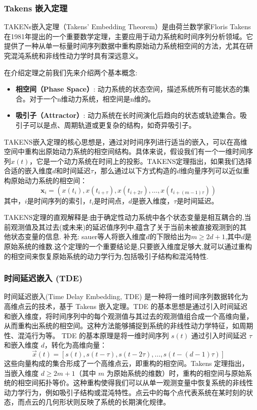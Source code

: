 \subsubsection{Takens 嵌入定理}
TAKENs嵌入定理（Takens' Embedding Theorem）\cite{takens2006detecting}是由荷兰数学家Floris Takens在1981年提出的一个重要数学定理，主要应用于动力系统和时间序列分析领域。它提供了一种从单一标量时间序列数据中重构原始动力系统相空间的方法，尤其在研究混沌系统和非线性动力学时具有深远意义。

在介绍定理之前我们先来介绍两个基本概念:
\begin{itemize}
    \item \textbf{相空间（Phase Space）}: 动力系统的状态空间，描述系统所有可能状态的集合。对于一个n维动力系统，相空间是n维的。
    \item \textbf{吸引子（Attractor）}: 动力系统在长时间演化后趋向的状态或轨迹集合。吸引子可以是点、周期轨道或更复杂的结构，如奇异吸引子。
\end{itemize}
TAKENS嵌入定理的核心思想是，通过对时间序列进行适当的嵌入，可以在高维空间中重构出原始动力系统的相空间结构。具体来说，假设我们有一个一维时间序列$x(t)$，它是一个动力系统在时间上的投影。TAKENS定理指出，如果我们选择合适的嵌入维度$d$和时间延迟$\tau$，那么通过以下方式构造的$d$维向量序列可以近似重构原始动力系统的相空间：
\begin{equation}
    \mathbf{x}_i = (x(t_i), x(t_{i+\tau}), x(t_{i+2\tau}), \ldots, x(t_{i+(m-1)\tau}))
\end{equation}
其中，$i$是时间序列的索引，$t_i$是时间点，$d$是嵌入维度，$\tau$是时间延迟。

TAKENS定理的直观解释是:由于确定性动力系统中各个状态变量是相互耦合的,当前观测值及其过去(或未来)的延迟值序列中,蕴含了关于当前未被直接观测到的其他状态变量的信息.
补充: sauer等人将嵌入维度$d$的下限给出为$m\geq 2d+1$,其中$d$是原始系统的维数.这个定理的一个重要结论是,只要嵌入维度足够大,就可以通过重构的相空间来恢复原始系统的动力学行为,包括吸引子结构和混沌特性.



\subsubsection{时间延迟嵌入 (TDE)}
时间延迟嵌入(Time Delay Embedding, TDE) 是一种将一维时间序列数据转化为高维点云的技术，基于 Takens 嵌入定理。TDE 的基本思想是通过引入时间延迟和嵌入维度，将时间序列中的每个观测值与其过去的观测值组合成一个高维向量，从而重构出系统的相空间。这种方法能够捕捉到系统的非线性动力学特征，如周期性、混沌行为等。
TDE 的基本原理是将一维时间序列 \( s(t) \) 通过引入时间延迟 \( \tau \) 和嵌入维度 \( d \)，转化为高维向量：
\begin{equation}
\vec{x}(t) = \left[ s(t), s(t - \tau), s(t - 2\tau), \dots, s(t - (d - 1)\tau) \right]
\end{equation}
这些向量构成的集合形成了一个高维点云，即重构的相空间。Takens 定理指出，当嵌入维度 \( d \geq 2m + 1 \)（其中 \( m \) 为原始系统的维数）时，重构的相空间与原始系统的相空间拓扑等价。这种重构使得我们可以从单一观测变量中恢复系统的非线性动力学行为，例如吸引子结构或混沌特性。点云中的每个点代表系统在某时刻的状态，而点云的几何形状则反映了系统的长期演化规律。


